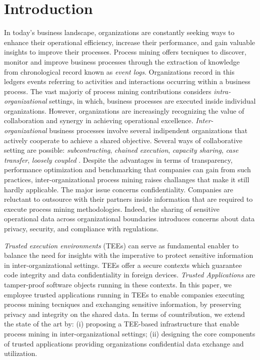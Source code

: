 \section{Introduction}
In today's business landscape, organizations are constantly seeking ways to enhance their operational efficiency, increase their performance, and gain valuable insights to improve their processes. Process mining offers tecniques to discover, monitor and improve business processes through the extraction of knowledge from chronological record known as \textit{event logs}. Organizations record in this ledgers events referring to activities and interactions occurring within a business process. The vast majoriy of process mining contributions considers \textit{intra-organizational} settings, in which, business processes are executed inside individual organizations. However, organizations are increasingly recognizing the value of collaboration and synergy in achieving operational excellence. \textit{Inter-organizational} business processes involve several indipendent organizations that actively cooperate to achieve a shared objective. Several ways of collaborative setting are possible: \textit{subcontracting}, \textit{chained execution}, \textit{capacity sharing}, \textit{case transfer}, \textit{loosely coupled} \cite{van1999process}. Despite the advantages in terms of transparency, performance optimization and benchmarking that companies can gain from such practices, inter-organizational process mining raises challanges that make it still hardly applicable. The major issue concerns confidentiality. Companies are reluctant to outsource with their partners inside information that are required to execute process mining methodologies. Indeed, the sharing of sensitive operational data across organizational boundaries introduces concerns about data privacy, security, and compliance with regulations. 

\textit{Trusted execution environments} (TEEs) can serve as fundamental enabler to balance the need for insights with the imperative to protect sensitive information in inter-organizational settings. TEEs offer a secure contexts which guarantee code integrity and data confidentiality in foreign devices. \textit{Trusted Applications} are tamper-proof software objects running in these contexts. In this paper, we employee trusted applications running in TEEs to enable companies executing process mining tecniques and exchanging sensitive information, by preserving privacy and integrity on the shared data. In terms of countribution, we extend the state of the art by: (i) proposing a TEE-based infrastructure that enable process mining in inter-organizational settings; (ii) designing the core components of trusted applications providing organizations confidential data exchange and utilization.

